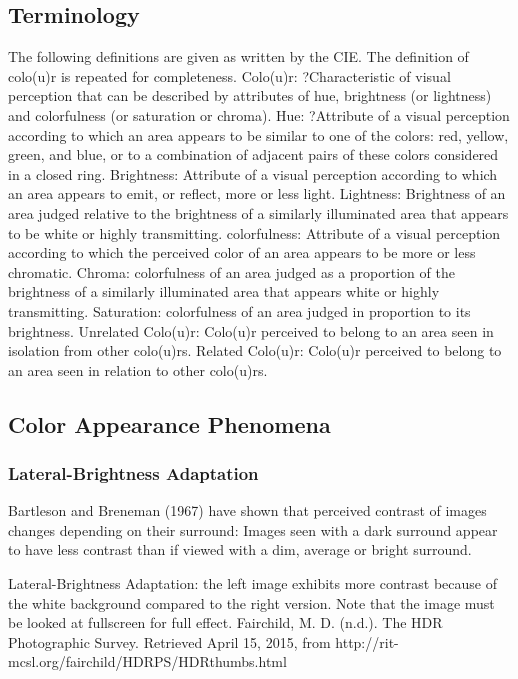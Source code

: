 \subsection{Terminology}%
\label{subsec:terminology}

The following definitions are given as written by the CIE. The definition of colo(u)r is repeated for completeness.
Colo(u)r: ?Characteristic of visual perception that can be described by attributes of hue, brightness (or lightness) and colorfulness (or saturation or chroma).
Hue: ?Attribute of a visual perception according to which an area appears to be similar to one of the colors: red, yellow, green, and blue, or to a combination of adjacent pairs of these colors considered in a closed ring.
Brightness: Attribute of a visual perception according to which an area appears to emit, or reflect, more or less light.
Lightness: Brightness of an area judged relative to the brightness of a similarly illuminated area that appears to be white or highly transmitting.
colorfulness: Attribute of a visual perception according to which the perceived color of an area appears to be more or less chromatic.
Chroma: colorfulness of an area judged as a proportion of the brightness of a similarly illuminated area that appears white or highly transmitting.
Saturation: colorfulness of an area judged in proportion to its brightness.
Unrelated Colo(u)r: Colo(u)r perceived to belong to an area seen in isolation from other colo(u)rs.
Related Colo(u)r: Colo(u)r perceived to belong to an area seen in relation to other colo(u)rs.

\subsection{Color Appearance Phenomena}%
\label{subsec:color-appearance-phenomena}

\subsubsection{Lateral-Brightness Adaptation}%
\label{subsubsec:lateral-brightness-adaptation}

Bartleson and Breneman (1967) have shown that perceived contrast of images changes depending on their surround: Images seen with a dark surround appear to have less contrast than if viewed with a dim, average or bright surround.

Lateral-Brightness Adaptation: the left image exhibits more contrast because of the white background compared to the right version. Note that the image must be looked at fullscreen for full effect.
Fairchild, M. D. (n.d.). The HDR Photographic Survey. Retrieved April 15, 2015, from http://rit-mcsl.org/fairchild/HDRPS/HDRthumbs.html

